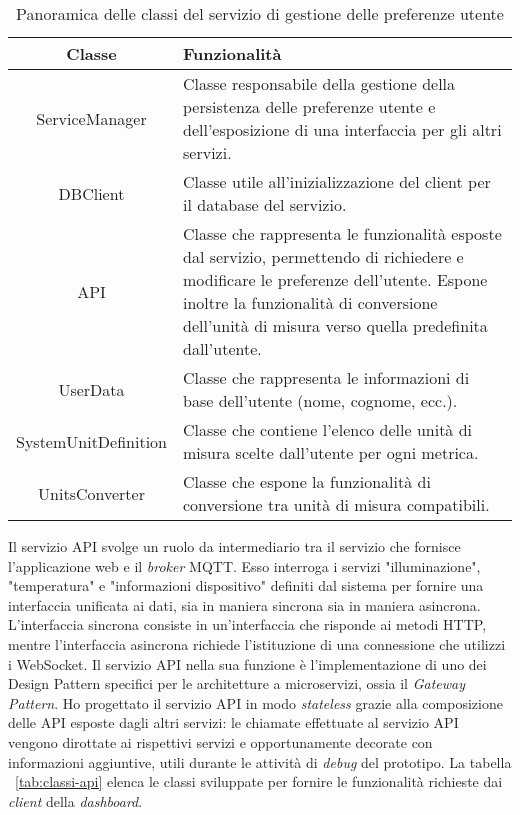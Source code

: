 \begin{table}[!h]
\caption{Panoramica delle classi del servizio di gestione delle preferenze utente}
\label{tab:classi-user}
\begin{tabularx}{\linewidth}{|c|X|}
\hline
\textbf{Classe} & \textbf{Funzionalità} \\
\hline
ServiceManager & Classe responsabile della gestione della persistenza delle preferenze utente e dell'esposizione di una interfaccia per gli altri servizi. \\
\hline
DBClient & Classe utile all'inizializzazione del client per il database del servizio. \\
\hline
API & Classe che rappresenta le funzionalità esposte dal servizio, permettendo di richiedere e modificare le preferenze dell'utente. Espone inoltre la funzionalità di conversione dell'unità di misura verso quella predefinita dall'utente. \\
\hline
UserData & Classe che rappresenta le informazioni di base dell'utente (nome, cognome, ecc.). \\
\hline
SystemUnitDefinition & Classe che contiene l'elenco delle unità di misura scelte dall'utente per ogni metrica. \\
\hline
UnitsConverter & Classe che espone la funzionalità di conversione tra unità di misura compatibili. \\
\hline
\end{tabularx}
\end{table}


Il servizio API svolge un ruolo da intermediario tra il servizio che fornisce l'applicazione web e il \emph{broker} MQTT.
Esso interroga i servizi "illuminazione", "temperatura" e "informazioni dispositivo"  definiti dal sistema per fornire una interfaccia unificata ai dati, sia in maniera sincrona sia in maniera asincrona.
L'interfaccia sincrona consiste in un'interfaccia che risponde ai metodi HTTP, mentre l'interfaccia asincrona richiede l'istituzione di una connessione che utilizzi i WebSocket.
Il servizio API nella sua funzione è l'implementazione di uno dei Design Pattern specifici per le architetture a microservizi, ossia il \emph{Gateway Pattern}.
Ho progettato il servizio API in modo \emph{stateless} grazie alla composizione delle API esposte dagli altri servizi: le chiamate effettuate al servizio API vengono dirottate ai rispettivi servizi e opportunamente decorate con informazioni aggiuntive, utili durante le attività di \emph{debug} del prototipo.
La tabella ~\ref{tab:classi-api} elenca le classi sviluppate per fornire le funzionalità richieste dai \emph{client} della \emph{dashboard}.

